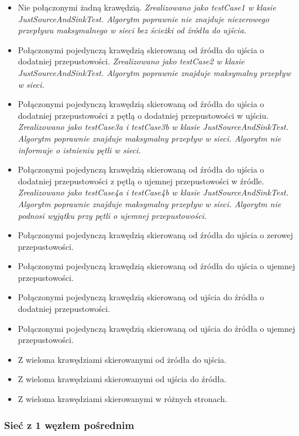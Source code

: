 \begin{itemize}[nosep]
    \item Nie połączonymi żadną krawędzią.
    \emph{Zrealizowano jako testCase1 w klasie JustSourceAndSinkTest.
    Algorytm poprawnie nie znajduje niezerowego przepływu maksymalnego w sieci
    bez ścieżki od źródła do ujścia.}

    \item Połączonymi pojedynczą krawędzią skierowaną od źródła do ujścia o dodatniej przepustowości.
    \emph{Zrealizowano jako testCase2 w klasie JustSourceAndSinkTest.
    Algorytm poprawnie znajduje maksymalny przepływ w sieci.}

    \item Połączonymi pojedynczą krawędzią skierowaną od źródła do ujścia o dodatniej przepustowości z pętlą o dodatniej przepustowości w ujściu.
    \emph{Zrealizowano jako testCase3a i testCase3b w klasie JustSourceAndSinkTest.
    Algorytm poprawnie znajduje maksymalny przepływ w sieci. Algorytm
    nie informuje o istnieniu pętli w sieci.}

    \item Połączonymi pojedynczą krawędzią skierowaną od źródła do ujścia o dodatniej przepustowości z pętlą o ujemnej przepustowości w źródle.
    \emph{Zrealizowano jako testCase4a i testCase4b w klasie JustSourceAndSinkTest.
    Algorytm poprawnie znajduje maksymalny przepływ w sieci. Algorytm nie podnosi
    wyjątku przy pętli o ujemnej przepustowości.}

    \item Połączonymi pojedynczą krawędzią skierowaną od źródła do ujścia o zerowej przepustowości.


    \item Połączonymi pojedynczą krawędzią skierowaną od źródła do ujścia o ujemnej przepustowości.
    \item Połączonymi pojedynczą krawędzią skierowaną od ujścia do źródła o dodatniej przepustowości.
    \item Połączonymi pojedynczą krawędzią skierowaną od ujścia do źródła o ujemnej przepustowości.
    \item Z wieloma krawędziami skierowanymi od żródła do ujścia.
    \item Z wieloma krawędziami skierowanymi od ujścia do źródła.
    \item Z wieloma krawędziami skierowanymi w różnych stronach.
\end{itemize}


\subsubsection{Sieć z 1 węzłem pośrednim}

